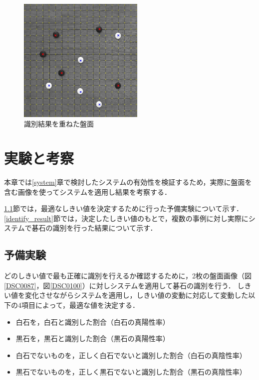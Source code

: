 \documentclass[openright]{nitocs}
\numberwithin{equation}{section}
\begin{document}
            \begin{figure}[tb] %
                \begin{center}
                \includegraphics[clip,width=60mm]{DSC_0041/result.jpg} 
                \caption{識別結果を重ねた盤面}
                \label{result}
                \end{center}
            \end{figure}

    \section{実験と考察} %
        本章では\ref{system}章で検討したシステムの有効性を検証するため，実際に盤面を含む画像を使ってシステムを適用し結果を考察する．

        \ref{threshold}節では，最適なしきい値を決定するために行った予備実験について示す．
        \ref{identify_result}節では，決定したしきい値のもとで，複数の事例に対し実際にシステムで碁石の識別を行った結果について示す．

        \subsection{予備実験} \label{threshold}
            どのしきい値で最も正確に識別を行えるか確認するために，2枚の盤面画像（図\ref{DSC0087}，図\ref{DSC0100}）に対しシステムを適用して碁石の識別を行う．
            しきい値を変化させながらシステムを適用し，しきい値の変動に対応して変動した以下の4項目によって，最適な値を決定する．
            \begin{itemize}
                \item 白石を，白石と識別した割合（白石の真陽性率）
                \item 黒石を，黒石と識別した割合（黒石の真陽性率）
                \item 白石でないものを，正しく白石でないと識別した割合（白石の真陰性率）
                \item 黒石でないものを，正しく黒石でないと識別した割合（黒石の真陰性率）
            \end{itemize}
\end{document}
